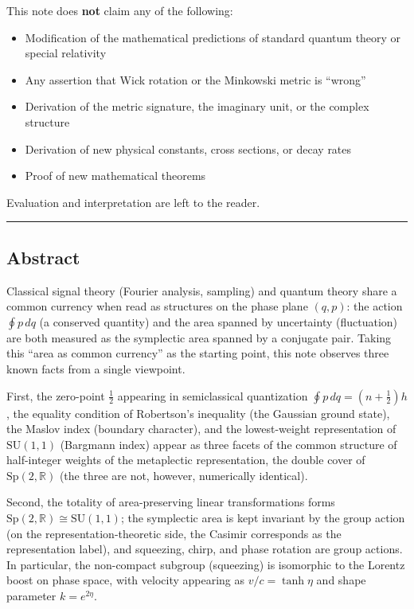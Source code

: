 \documentclass[
]{article}
\providecommand{\tightlist}{%
  \setlength{\itemsep}{0pt}\setlength{\parskip}{0pt}}
\begin{document}
This note does \textbf{not} claim any of the following:

\begin{itemize}
\tightlist
\item
  Modification of the mathematical predictions of standard quantum
  theory or special relativity
\item
  Any assertion that Wick rotation or the Minkowski metric is ``wrong''
\item
  Derivation of the metric signature, the imaginary unit, or the complex
  structure
\item
  Derivation of new physical constants, cross sections, or decay rates
\item
  Proof of new mathematical theorems
\end{itemize}

Evaluation and interpretation are left to the reader.

\begin{center}\rule{0.5\linewidth}{0.5pt}\end{center}

\subsection{Abstract}\label{abstract}

Classical signal theory (Fourier analysis, sampling) and quantum theory
share a common currency when read as structures on the phase plane
\((q,p)\): the action \(\oint p\,dq\) (a conserved quantity) and the
area spanned by uncertainty (fluctuation) are both measured as the
symplectic area spanned by a conjugate pair. Taking this ``area as
common currency'' as the starting point, this note observes three known
facts from a single viewpoint.

First, the zero-point \(\tfrac12\) appearing in semiclassical
quantization \(\oint p\,dq=(n+\tfrac12)h\), the equality condition of
Robertson's inequality (the Gaussian ground state), the Maslov index
(boundary character), and the lowest-weight representation of
\(\mathrm{SU}(1,1)\) (Bargmann index) appear as three facets of the
common structure of half-integer weights of the metaplectic
representation, the double cover of \(\mathrm{Sp}(2,\mathbb{R})\) (the
three are not, however, numerically identical).

Second, the totality of area-preserving linear transformations forms
\(\mathrm{Sp}(2,\mathbb{R})\cong\mathrm{SU}(1,1)\); the symplectic area
is kept invariant by the group action (on the representation-theoretic
side, the Casimir corresponds as the representation label), and
squeezing, chirp, and phase rotation are group actions. In particular,
the non-compact subgroup (squeezing) is isomorphic to the Lorentz boost
on phase space, with velocity appearing as \(v/c=\tanh\eta\) and shape
parameter \(k=e^{2\eta}\).
\end{document}

